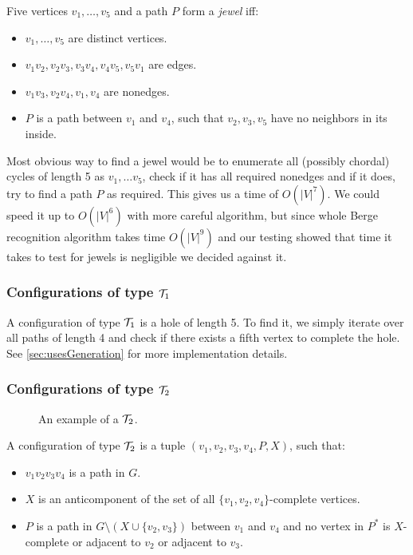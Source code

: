 Five vertices $v_1, \ldots, v_5$ and a path $P$ form a \emph{jewel} iff:

\begin{itemize}
	\item $v_1, \ldots, v_5$ are distinct vertices.
	\item $v_1v_2, v_2v_3, v_3v_4, v_4v_5, v_5v_1$ are edges.
	\item $v_1v_3, v_2v_4, v_1,v_4$ are nonedges.
	\item $P$ is a path between $v_1$ and $v_4$, such that $v_2, v_3, v_5$ have no neighbors in its inside.
\end{itemize}

Most obvious way to find a jewel would be to enumerate all (possibly chordal) cycles of length 5 as $v_1, \ldots v_5$, check if it has all required nonedges and if it does, try to find a path $P$ as required. This gives us a time of $O(|V|^7)$. We could speed it up to $O(|V|^6)$ with more careful algorithm, but since whole Berge recognition algorithm takes time $O(|V|^9)$ and our testing showed that time it takes to test for jewels is negligible we decided against it.

\subsubsection{Configurations of type $\mathcal{T}_1$}

A configuration of type $\mathcal{T}_1$ is a hole of length 5. To find it, we simply iterate over all paths of length 4 and check if there exists a fifth vertex to complete the hole. See \cref{sec:usesGeneration} for more implementation details.

\subsubsection{Configurations of type $\mathcal{T}_2$}

\begin{wrapfigure}{r}{0.35\textwidth}
	
	\caption{An example of a $\mathcal{T}_2$.}%
	\vspace{-1.5cm}
\end{wrapfigure}

A configuration of type $\mathcal{T}_2$ is a tuple $(v_1, v_2, v_3, v_4, P, X)$, such that:
\begin{itemize}
	\item $v_1v_2v_3v_4$ is a path in $G$.
	\item $X$ is an anticomponent of the set of all $\{v_1, v_2, v_4\}$-complete vertices.
	\item $P$ is a path in $G\setminus(X \cup \{v_2, v_3\})$ between $v_1$ and $v_4$ and no vertex in $P^*$ is $X$-complete or adjacent to $v_2$ or adjacent to $v_3$.
\end{itemize}

